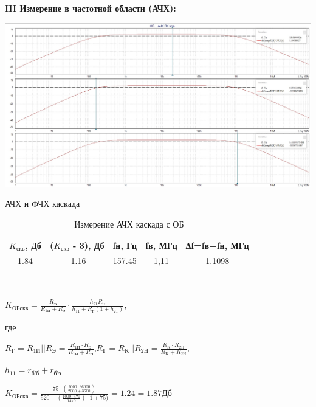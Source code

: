 \documentclass[a4paper,14pt]{extarticle}
\begin{document}
    \newpage 
    \textbf{III Измерение в частотной области (АЧХ):}
    \begin{center}
        \includegraphics[scale=0.25]{3.jpg}
    \end{center}
   \begin{center}
        АЧХ и ФЧХ каскада
    \end{center}

    \begin{table}[ht]
        \begin{center}
            \caption{Измерение АЧХ каскада с ОБ}
            \begin{tabular}{ |c|c|c|c|c| }
                \hline
                $K_{\text{скв}}$, Дб & ($K_{\text{скв}}$ - 3), Дб&fн, Гц & fв, МГц & ∆f=fв−fн, МГц \\
                \hline 
                1.84 & -1.16 & 157.45 & 1,11 & 1.1098 \\
                \hline
            \end{tabular}\\
        \end{center}
    \end{table}
    \vspace{-1cm}
    \begin{center}
        $K_{\text{ОБскв}}=\frac{R_{\text{Э}}}{R_{\text{1И}}+R_{\text{Э}}}\cdot\frac{h_{21}R_{\text{Н}}}{h_{11}+R_{\text{Г}}(1+h_{21})}$,

        где 

        $R_{\text{Г}}=R_{\text{1И}}||R_{\text{Э}}=\frac{R_{\text{1И}}\cdot R_{\text{Э}}}{R_{\text{1И}}+R_{\text{Э}}}$,\quad $R_{\text{Г}}=R_{\text{K}}||R_{\text{2H}}=\frac{R_{\text{K}}\cdot R_{\text{2H}}}{R_{\text{K}}+R_{\text{2H}}}$,

        $h_{11}=r_{\text{б'б}}+r_{\text{б'э}}$
    \end{center}
    \begin{center}
        $K_{\text{ОБскв}}=\frac{75\cdot(\frac{2000\cdot36000}{2000+3600})}{520+(\frac{1000\cdot470}{1470})\cdot1+75)} = 1.24 = 1.87\text{Дб}$
    \end{center}
\end{document}
